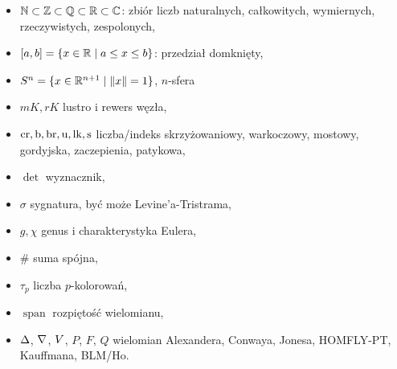 
\begin{itemize}
    \item $\mathbb N \subset \mathbb Z \subset \mathbb Q \subset \mathbb R \subset \mathbb C$: zbiór liczb naturalnych, całkowitych, wymiernych, rzeczywistych, zespolonych,
    \item $[a, b] = \{x \in \mathbb R \mid a \le x \le b\}$: przedział domknięty,
    \item $S^n = \{x \in \mathbb R^{n+1} \mid \|x\| = 1\}$, $n$-sfera
    \item $mK, rK$ lustro i rewers węzła,
    \item $\operatorname{cr}, \operatorname{b}, \operatorname{br}, \operatorname{u}, \operatorname{lk}, \operatorname{s}$ liczba/indeks skrzyżowaniowy, warkoczowy, mostowy, gordyjska, zaczepienia, patykowa,
    \item $\det$ wyznacznik,
    \item $\sigma$ sygnatura, być może Levine'a-Tristrama,
    \item $g, \chi$ genus i charakterystyka Eulera,
    \item $\#$ suma spójna,
    \item $\tau_p$ liczba $p$-kolorowań,
    \item $\operatorname{span}$ rozpiętość wielomianu,
    \item $\Delta$, $\nabla$, $V$, $P$, $F$, $Q$ wielomian Alexandera, Conwaya, Jonesa, HOMFLY-PT, Kauffmana, BLM/Ho.
\end{itemize}

